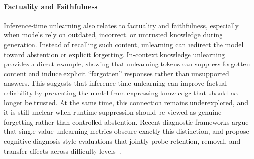 \paragraph{Factuality and Faithfulness}
% 
Inference-time unlearning also relates to factuality and faithfulness, especially when models rely on outdated, incorrect, or untrusted knowledge during generation. Instead of recalling such content, unlearning can redirect the model toward abstention or explicit forgetting. In-context knowledge unlearning~\citep{takashiro2024answer} provides a direct example, showing that unlearning tokens can suppress forgotten content and induce explicit ``forgotten'' responses rather than unsupported answers. This suggests that inference-time unlearning can improve factual reliability by preventing the model from expressing knowledge that should no longer be trusted. At the same time, this connection remains underexplored, and it is still unclear when runtime suppression should be viewed as genuine forgetting rather than controlled abstention. Recent diagnostic frameworks argue that single-value unlearning metrics obscure exactly this distinction, and propose cognitive-diagnosis-style evaluations that jointly probe retention, removal, and transfer effects across difficulty levels~\citep{lang2025beyond}.






